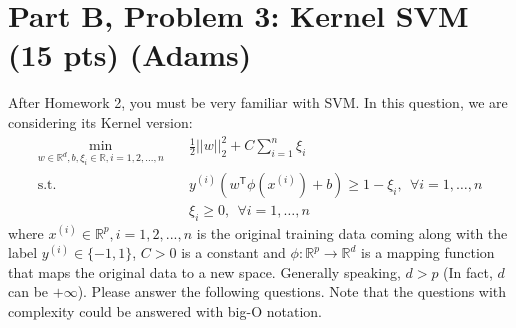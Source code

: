
\section*{Part B, Problem 3: Kernel SVM (15 pts) (Adams)}
After Homework 2, you must be very familiar with SVM.
In this question, we are considering its Kernel version:
\begin{align*}
\min_{w\in \mathbb{R}^d, b, \xi_i\in\mathbb{R},i=1,2,...,n} &\quad \frac{1}{2}||w||_2^2 + C\sum_{i=1}^n\xi_i\\
\text{s.t.} &\quad y^{(i)}(w^\mathsf{T}\phi(x^{(i)}) + b) \geq 1-\xi_i,~~  \forall i = 1,\ldots, n\\
 &\quad \xi_i \geq 0, ~~ \forall i = 1,\ldots, n
\end{align*}
where $x^{(i)}\in\mathbb{R}^p, i=1,2,...,n$ is the original training data coming along with the label $y^{(i)}\in\{-1,1\}$, $C>0$ is a constant and $\phi: \mathbb{R}^p \rightarrow \mathbb{R}^d$ is a mapping function that maps the original data to a new space. Generally speaking, $d>p$ (In fact, $d$ can be $+\infty$). Please answer the following questions. Note that the questions with complexity could be answered with big-O notation.

